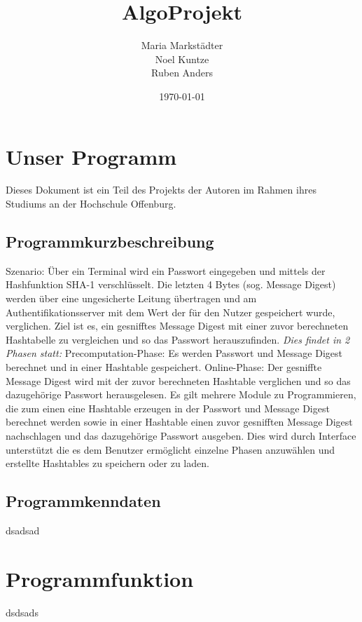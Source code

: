 \documentclass[11pt]{article}
\title{\textbf{AlgoProjekt}}
\author{Maria Markstädter\\
                Noel Kuntze\\
                Ruben Anders\\}
\date{\today}
\begin{document}
 

\maketitle
 
\tableofcontents
  \section{Unser Programm}
Dieses Dokument ist ein Teil des Projekts der Autoren im Rahmen ihres Studiums an der Hochschule Offenburg.
  \subsection{Programmkurzbeschreibung}
  Szenario:
Über ein Terminal wird ein Passwort eingegeben und  mittels der Hashfunktion SHA-1 verschlüsselt. Die letzten 4 Bytes (sog. Message Digest) werden über eine ungesicherte Leitung übertragen und am Authentifikationsserver mit dem Wert der für den Nutzer gespeichert wurde, verglichen. \newline 
Ziel ist es, ein gesnifftes Message Digest mit einer zuvor berechneten Hashtabelle zu vergleichen und so das Passwort herauszufinden.\vspace{2px}   \newline 
{\itshape{Dies findet in 2 Phasen statt:}} \vspace{2px}   \newline
Precomputation-Phase: Es werden Passwort und Message Digest berechnet und in einer Hashtable gespeichert.\vspace{2px} \newline 
Online-Phase: Der gesniffte Message Digest wird mit der zuvor berechneten Hashtable verglichen und so das dazugehörige Passwort herausgelesen. 
Es gilt mehrere Module zu Programmieren, die zum einen eine Hashtable erzeugen in der Passwort und Message Digest berechnet werden sowie in einer Hashtable einen zuvor gesnifften Message Digest nachschlagen und das dazugehörige Passwort ausgeben. Dies wird durch Interface unterstützt die es dem Benutzer ermöglicht einzelne Phasen anzuwählen und erstellte Hashtables zu speichern oder zu laden.

  \subsection{Programmkenndaten}
  dsadsad
  
  \section{Programmfunktion}
  dsdsads
\end{document}
